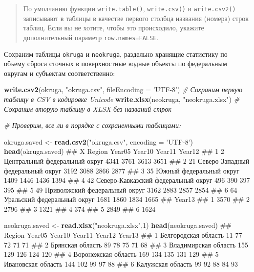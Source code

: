 \documentclass[]{book}
\newenvironment{Shaded}{\begin{snugshade}}{\end{snugshade}}
\newcommand{\KeywordTok}[1]{\textcolor[rgb]{0.13,0.29,0.53}{\textbf{#1}}}
\newcommand{\DataTypeTok}[1]{\textcolor[rgb]{0.13,0.29,0.53}{#1}}
\newcommand{\DecValTok}[1]{\textcolor[rgb]{0.00,0.00,0.81}{#1}}
\newcommand{\StringTok}[1]{\textcolor[rgb]{0.31,0.60,0.02}{#1}}
\newcommand{\CommentTok}[1]{\textcolor[rgb]{0.56,0.35,0.01}{\textit{#1}}}
\newcommand{\NormalTok}[1]{#1}
\begin{document}
\begin{quote}
По умолчанию функции \texttt{write.table()}, \texttt{write.csv()} и
\texttt{write.csv2()} записывают в таблицы в качестве первого столбца
названия (номера) строк таблиц. Если вы не хотите, чтобы это
происходило, укажите дополнительный параметр \texttt{row.names=FALSE}.
\end{quote}

Сохраним таблицы \texttt{okruga} и \texttt{neokruga}, раздельно хранящие
статистику по объему сброса сточных в поверхностные водные объекты по
федеральным округам и субъектам соответственно:

\begin{Shaded}
\begin{Highlighting}[]
\KeywordTok{write.csv2}\NormalTok{(okruga, }\StringTok{"okruga.csv"}\NormalTok{, }\DataTypeTok{fileEncoding =} \StringTok{'UTF-8'}\NormalTok{) }\CommentTok{# Сохраним первую таблицу в CSV в кодировке Unicode}
\KeywordTok{write.xlsx}\NormalTok{(neokruga, }\StringTok{"neokruga.xlsx"}\NormalTok{) }\CommentTok{# Сохраним вторую таблицу в XLSX без названий строк}

\CommentTok{# Проверим, все ли в порядке с сохраненными таблицами:}

\NormalTok{okruga.saved <-}\StringTok{ }\KeywordTok{read.csv2}\NormalTok{(}\StringTok{"okruga.csv"}\NormalTok{, }\DataTypeTok{encoding =} \StringTok{'UTF-8'}\NormalTok{)}
\KeywordTok{head}\NormalTok{(okruga.saved)}
\NormalTok{##    X                               Region Year05 Year10 Year11 Year12}
\NormalTok{## 1  2       Центральный федеральный округ    4341   3761   3613   3651}
\NormalTok{## 2 21   Северо-Западный федеральный округ    3192   3088   2866   2877}
\NormalTok{## 3 35             Южный федеральный округ    1409   1446   1436   1394}
\NormalTok{## 4 42 Северо-Кавказский федеральный округ     496    390    397    395}
\NormalTok{## 5 49       Приволжский федеральный округ    3162   2883   2857   2854}
\NormalTok{## 6 64         Уральский федеральный округ    1681   1860   1834   1665}
\NormalTok{##   Year13}
\NormalTok{## 1   3570}
\NormalTok{## 2   2796}
\NormalTok{## 3   1321}
\NormalTok{## 4    374}
\NormalTok{## 5   2849}
\NormalTok{## 6   1624}

\NormalTok{neokruga.saved <-}\StringTok{ }\KeywordTok{read.xlsx}\NormalTok{(}\StringTok{"neokruga.xlsx"}\NormalTok{,}\DecValTok{1}\NormalTok{)}
\KeywordTok{head}\NormalTok{(neokruga.saved)}
\NormalTok{##                 Region Year05 Year10 Year11 Year12 Year13}
\NormalTok{## 1 Белгородская область     11     77     72     71     71}
\NormalTok{## 2     Брянская область     89     78     75     71     68}
\NormalTok{## 3 Владимирская область    155    129    126    124    120}
\NormalTok{## 4  Воронежская область    169    134    135    131    129}
\NormalTok{## 5   Ивановская область    144    102     99     97     88}
\NormalTok{## 6    Калужская область     99     92     88     84     93}
\end{Highlighting}
\end{Shaded}
\end{document}
